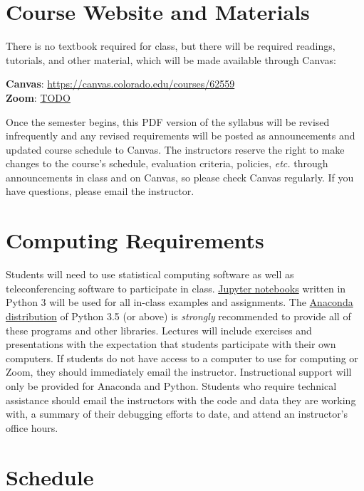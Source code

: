 \documentclass[10pt]{memoir}
\def\myzoomurl{TODO}
\def\mycanvasurl{https://canvas.colorado.edu/courses/62559}
\begin{document}
\section{\textbf{Course Website and Materials}}
There is no textbook required for class, but there will be required readings, tutorials, and other material, which will be made available through Canvas:
\vspace{-8pt}
    \begin{center}
    \Large{\textbf{Canvas}: \href{\mycanvasurl}{\mycanvasurl}}\\
    \Large{\textbf{Zoom}: \href{\myzoomurl}{\myzoomurl}}
    \end{center}
\vspace{-8pt}
Once the semester begins, this PDF version of the syllabus will be revised infrequently and any revised requirements will be posted as announcements and updated course schedule to Canvas. The instructors reserve the right to make changes to the course's schedule, evaluation criteria, policies, \textit{etc.} through announcements in class and on Canvas, so please check Canvas regularly. If you have questions, please email the instructor.


\section{\textbf{Computing Requirements}}
Students will need to use statistical computing software as well as teleconferencing software to participate in class. \href{http://jupyter.org/}{Jupyter notebooks} written in Python 3 will be used for all in-class examples and assignments. The \href{https://www.continuum.io/why-anaconda}{Anaconda distribution} of Python 3.5 (or above) is \textit{strongly} recommended to provide all of these programs and other libraries. Lectures will include exercises and presentations with the expectation that students participate with their own computers. If students do not have access to a computer to use for computing or Zoom, they should immediately email the instructor. Instructional support will only be provided for Anaconda and Python. Students who require technical assistance should email the instructors with the code and data they are working with, a summary of their debugging efforts to date, and attend an instructor's office hours.

\clearpage

\section{\textbf{Schedule}}
\end{document}
